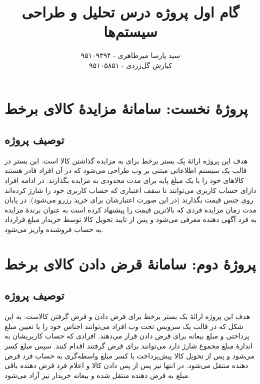 \documentclass{article}
\title{\textbf{گام اول پروژه درس تحلیل و طراحی سیستم‌ها}}
\author{سید پارسا میرطاهری - ۹۵۱۰۹۳۹۴ \\ کیارش گل‌زردی - ۹۵۱۰۵۸۵۱}
\begin{document}
\date{}

\maketitle

\section{پروژهٔ نخست: سامانهٔ مزایدهٔ کالای برخط}

\subsection{توصیف پروژه}

هدف این پروژه ارائهٔ یک بستر برخط برای به مزایده گذاشتن کالا است. این بستر در قالب یک سیستم اطلاعاتی مبتنی بر وب طراحی می‌شود که در آن افراد قادر هستند کالاهای خود را با یک مبلغ پایه برای مدت محدودی به مزایده بگذارند. در ادامه افراد دارای حساب کاربری می‌توانند تا سقف اعتباری که حساب کاربری خود را شارژ کرده‌اند روی جنس قیمت بگذارند (در این صورت اعتبارشان برای خرید رزرو می‌شود). در پایان مدت زمان مزایده فردی که بالاترین قیمت را پیشنهاد کرده است به عنوان برندهٔ مزایده به فرد آگهی دهنده معرفی می‌شود و پس از تایید تحویل کالا توسط خریدار مبلغ قرارداد به حساب فروشنده واریز می‌شود.

\subsection{}

\subsection{}


\section{پروژهٔ دوم: سامانهٔ قرض دادن کالای برخط}

\subsection{توصیف پروژه}

هدف این پروژه ارائهٔ یک بستر برخط برای قرض دادن و قرض گرفتن کالاست. به این شکل که در قالب یک سرویس تحت وب افراد می‌توانند اجناس خود را با تعیین مبلغ پرداختی و مبلغ بیعانه برای قرض دادن قرار می‌دهند. افرادی که حساب کاربریشان به اندازهٔ مبلغ مجموع شارژ دارد می‌توانند برای قرض گرفتند اقدام کنند. سپس مبلغ کسر می‌شود و پس از تحویل کالا پیش‌پرداخت با کسر مبلغ واسطه‌گری به حساب فرد قرض دهنده منتقل می‌شود. در انتها نیز پس از پس دادن کالا و اعلام فرد قرض دهنده باقی مبلغ به قرض دهنده منتقل شده و بیعانه خریدار نیز آزاد می‌شود.
\end{document}
